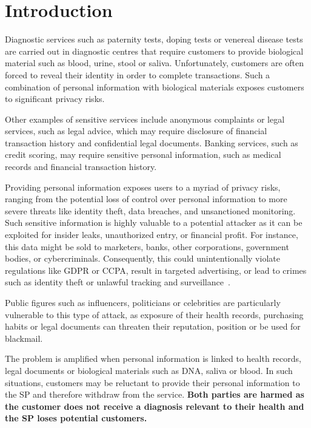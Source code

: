 \documentclass[pdftex,twocolumn,epjc3]{svjour3}
\begin{document}
\section{Introduction}
\label{sec:introduction}
Diagnostic services such as paternity tests, doping tests or venereal disease tests are carried out in diagnostic centres that require customers to provide biological material such as blood, urine, stool or saliva. Unfortunately, customers are often forced to reveal their identity in order to complete transactions. Such a combination of personal information with biological materials exposes customers to significant privacy risks.

\begin{sloppypar}
Other examples of sensitive services include anonymous complaints or legal services, such as legal advice, which may require disclosure of financial transaction history and confidential legal documents. Banking services, such as credit scoring, may require sensitive personal information, such as medical records and financial transaction history.
\end{sloppypar}

Providing personal information exposes users to a myriad of privacy risks, ranging from the potential loss of control over personal information to more severe threats like identity theft, data breaches, and unsanctioned monitoring. Such sensitive information is highly valuable to a potential attacker as it can be exploited for insider leaks, unauthorized entry, or financial profit. For instance, this data might be sold to marketers, banks, other corporations, government bodies, or cybercriminals. Consequently, this could unintentionally violate regulations like GDPR or CCPA, result in targeted advertising, or lead to crimes such as identity theft or unlawful tracking and surveillance~\cite{smithInformationPrivacyResearch2011}.

Public figures such as influencers, politicians or celebrities are particularly vulnerable to this type of attack, as exposure of their health records, purchasing habits or legal documents can threaten their reputation, position or be used for blackmail.

The problem is amplified when personal information is linked to health records, legal documents or biological materials such as DNA, saliva or blood. In such situations, customers may be reluctant to provide their personal information to the SP and therefore withdraw from the service.  \textbf{Both parties are harmed as the customer does not receive a diagnosis relevant to their health and the SP loses potential customers.}~\cite{klitzmanExclusionGeneticInformation2010,blackPresymptomaticTestingConfidentiality2021}
\end{document}
